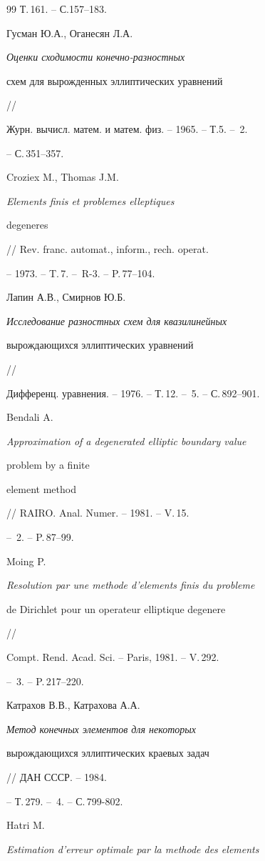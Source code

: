\begin{thebibliography}{99}
Т.\,161. -- С.157--183.




Гусман Ю.А., Оганесян Л.А. {\em Оценки сходимости конечно-разностных


схем для вырожденных эллиптических уравнений} //


Журн. вычисл. матем. и матем. физ. -- 1965. -- Т.5. -- \No\,2.


-- С.\,351--357.




Croziex M., Thomas J.M. {\em Elements finis et problemes elleptiques


degeneres} // Rev. franc. automat., inform., rech. operat.


-- 1973. -- T.\,7. -- \No\,R-3. -- P.\,77--104.




Лапин А.В., Смирнов Ю.Б. {\em Исследование разностных схем для квазилинейных 


вырождающихся эллиптических уравнений} //


Дифференц. уравнения. -- 1976. -- Т.\,12. -- \No\,5. -- С.\,892--901.




Bendali A. {\em Approximation of a degenerated elliptic boundary value


problem by a finite


element method} // RAIRO. Anal. Numer. -- 1981. -- V.\,15.


-- \No\,2. -- P.\,87--99.




Moing P. {\em Resolution par une methode d'elements finis du probleme


de Dirichlet pour un operateur elliptique degenere} //


Compt. Rend. Acad. Sci. -- Paris, 1981. -- V.\,292. 


-- \No\,3. -- P.\,217--220.




Катрахов В.В., Катрахова А.А. {\em Метод конечных элементов для некоторых 


вырождающихся эллиптических краевых задач} // ДАН СССР. -- 1984. 


-- Т.\,279. -- \No\,4. -- С.\,799-802.




Hatri M. {\em Estimation d'erreur optimale par la methode des elements


}
\end{thebibliography}
